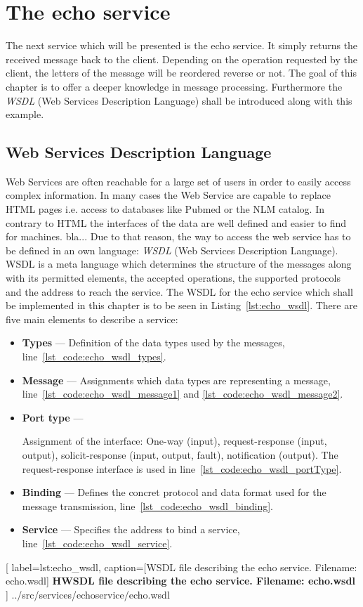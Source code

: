 \chapter{The echo service}

The next service which will be presented is the echo service. It simply returns the received message back to the client.
Depending on the operation requested by the client, the letters of the message will be reordered reverse or not.
The goal of this chapter is to offer a deeper knowledge in message processing. Furthermore the \textit{WSDL} (Web Services Description Language) shall be introduced along with this example.

\section{Web Services Description Language}

Web Services are often reachable for a large set of users in order to easily access complex information. In many cases the Web Service are capable to replace HTML pages i.e. access to databases like Pubmed or the NLM catalog.
In contrary to HTML the interfaces of the data are well defined and easier to find for machines. bla...
Due to that reason, the way to access the web service has to be defined in an own language: \textit{WSDL} (Web Services Description Language).
WSDL is a meta language which determines the structure of the messages along with its permitted elements, the accepted operations, the supported protocols and the address to reach the service. 
The WSDL for the echo service which shall be implemented in this chapter is to be seen in Listing~\ref{lst:echo_wsdl}. There are five main elements to describe a service:
\begin{itemize}
	\item \textbf{Types} --- Definition of the data types used by the messages, line~\ref{lst_code:echo_wsdl_types}.
	\item \textbf{Message} --- Assignments which data types are representing a message, line~\ref{lst_code:echo_wsdl_message1} and \ref{lst_code:echo_wsdl_message2}.
	\item \textbf{Port type} --- \parbox[t]{13cm}{Assignment of the interface: One-way (input), request-response (input, output), solicit-response (input, output, fault), notification (output). The request-response interface is used in line~\ref{lst_code:echo_wsdl_portType}.}
	\item \textbf{Binding} --- Defines the concret protocol and data format used for the message transmission, line~\ref{lst_code:echo_wsdl_binding}.
	\item \textbf{Service} --- Specifies the address to bind a service, line~\ref{lst_code:echo_wsdl_service}.
\end{itemize}

	[
	label=lst:echo_wsdl,
	caption={[WSDL file describing the echo service. Filename: echo.wsdl]
	\textbf{HWSDL file describing the echo service. Filename: echo.wsdl}}
	]
{../src/services/echoservice/echo.wsdl}


